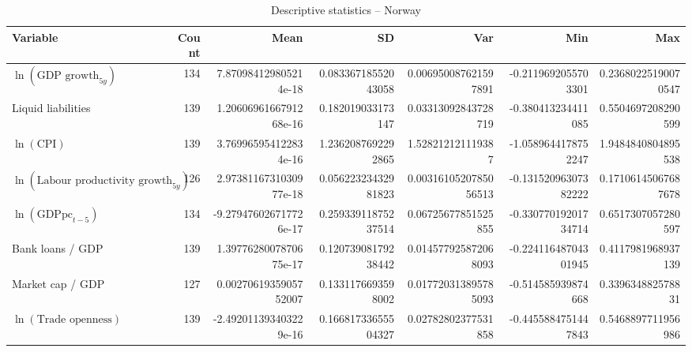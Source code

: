 \begin{table}[!htbp]
\centering
\caption{Descriptive statistics -- Norway}
\footnotesize
\begin{tabular}{lrrrrrr}
\toprule
Variable & Count & Mean & SD & Var & Min & Max \\
\midrule
$\ln(\text{GDP growth}_{5y})$ & 134 & 7.870984129805214e-18 & 0.08336718552043058 & 0.006950087621597891 & -0.2119692055703301 & 0.23680225190070547 \\
Liquid liabilities & 139 & 1.2060696166791268e-16 & 0.182019033173147 & 0.03313092843728719 & -0.380413234411085 & 0.5504697208290599 \\
$\ln(\text{CPI})$ & 139 & 3.769965954122834e-16 & 1.2362087692292865 & 1.528212121119387 & -1.0589644178752247 & 1.9484840804895538 \\
$\ln(\text{Labour productivity growth}_{5y})$ & 126 & 2.9738116731030977e-18 & 0.05622323432981823 & 0.0031610520785056513 & -0.13152096307382222 & 0.17106145067687678 \\
$\ln(\text{GDPpc}_{t-5})$ & 134 & -9.279476026717726e-17 & 0.25933911875237514 & 0.06725677851525855 & -0.33077019201734714 & 0.6517307057280597 \\
Bank loans / GDP & 139 & 1.3977628007870675e-17 & 0.12073908179238442 & 0.014577925872068093 & -0.22411648704301945 & 0.4117981968937139 \\
Market cap / GDP & 127 & 0.0027061935905752007 & 0.1331176693598002 & 0.017720313895785093 & -0.514585939874668 & 0.339634882578831 \\
$\ln(\text{Trade openness})$ & 139 & -2.492011393403229e-16 & 0.16681733655504327 & 0.02782802377531858 & -0.4455884751447843 & 0.5468897711956986 \\
\bottomrule
\end{tabular}
\end{table}


